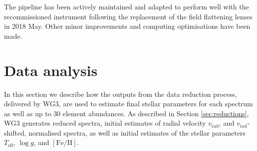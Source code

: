 \documentclass[fleqn,usenatbib,useAMS]{mnras}
\newcommand{\Teff}{$T_\mathrm{eff}$\xspace}
\newcommand{\logg}{$\log g$\xspace}
\newcommand{\feh}{$\mathrm{[Fe/H]}$\xspace}
\newcommand{\vrad}{$v_\mathrm{rad}$\xspace}
\begin{document}
The pipeline has been actively maintained and adapted to perform well with the recommissioned instrument %
following the replacement of the field flattening lenses in 2018 May. Other minor improvements and computing optimisations have been made.

\section{Data analysis} \label{sec:analysis}

In this section we describe how the outputs from the data reduction process, delivered by WG3, are used to estimate final stellar parameters for each spectrum as well as up to 30 element abundances. As described in Section \ref{sec:reductions}, WG3 generates reduced spectra, initial estimates of radial velocity \vrad, and \vrad-shifted, normalised spectra, as well as initial estimates of the stellar parameters \Teff, \logg, and \feh. 
\end{document}
